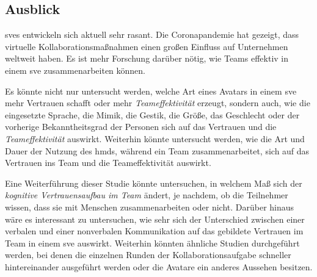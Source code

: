 \documentclass[a4paper,11pt]{article}%
\renewcommand{\\}{\vspace*{0.5\baselineskip} \newline}
\begin{document}
{{\subsection{Ausblick}
\ac{sve}s entwickeln sich aktuell sehr rasant. Die Coronapandemie hat gezeigt, dass virtuelle Kollaborationsmaßnahmen einen großen Einfluss auf Unternehmen weltweit haben. Es ist mehr Forschung darüber nötig, wie Teams effektiv in einem \ac{sve} zusammenarbeiten können.

Es könnte nicht nur untersucht werden, welche Art eines Avatars in einem \ac{sve} mehr Vertrauen schafft oder mehr \textit{Teameffektivität} erzeugt, sondern auch, wie die eingesetzte Sprache, die Mimik, die Gestik, die Größe, das Geschlecht oder der vorherige Bekanntheitsgrad der Personen sich auf das Vertrauen und die \textit{Teameffektivität} auswirkt.
Weiterhin könnte untersucht werden, wie die Art und Dauer der Nutzung des \ac{hmd}s, während ein Team zusammenarbeitet, sich auf das Vertrauen ins Team und die Teameffektivität auswirkt.

Eine Weiterführung dieser Studie könnte untersuchen, in welchem Maß sich der \textit{kognitive Vertrauensaufbau im Team} ändert, je nachdem, ob die Teilnehmer wissen, dass sie mit Menschen zusammenarbeiten oder nicht. Darüber hinaus wäre es interessant zu untersuchen, wie sehr sich der Unterschied zwischen einer verbalen und einer nonverbalen Kommunikation auf das gebildete Vertrauen im Team in einem \ac{sve} auswirkt.  
Weiterhin könnten ähnliche Studien durchgeführt werden, bei denen die einzelnen Runden der Kollaborationsaufgabe schneller hintereinander ausgeführt werden oder die Avatare ein anderes Aussehen besitzen.

%
%
%
\clearpage
\newpage
}}
\end{document}
